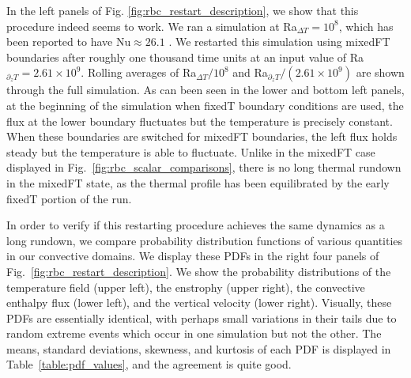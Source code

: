 \documentclass[aps, pre, onecolumn, nofootinbib, notitlepage, groupedaddress, amsfonts, amssymb, amsmath, longbibliography]{revtex4-1}
\begin{document}
In the left panels of Fig. \ref{fig:rbc_restart_description}, we show that this procedure indeed seems to work.
We ran a simulation at Ra$_{\Delta T} = 10^8$, which has been reported to have $\text{Nu} \approx 26.1$ \cite{zhu&all2018}.
We restarted this simulation using mixedFT boundaries after roughly one thousand time units at an input value of Ra$_{\partial_z T} = 2.61 \times 10^9$.
Rolling averages of Ra$_{\Delta T} / 10^8$ and Ra$_{\partial_z T} / (2.61 \times 10^9)$ are shown through the full simulation.
As can been seen in the lower and bottom left panels, at the beginning of the simulation when fixedT boundary conditions are used, the flux at the lower boundary fluctuates but the temperature is precisely constant.
When these boundaries are switched for mixedFT boundaries, the left flux holds steady but the temperature is able to fluctuate.
Unlike in the mixedFT case displayed in Fig.~\ref{fig:rbc_scalar_comparisons}, there is no long thermal rundown in the mixedFT state, as the thermal profile has been equilibrated by the early fixedT portion of the run.

In order to verify if this restarting procedure achieves the same dynamics as a long rundown, we compare probability distribution functions of various quantities in our convective domains.
We display these PDFs in the right four panels of Fig.~\ref{fig:rbc_restart_description}.
We show the probability distributions of the temperature field (upper left), the enstrophy (upper right), the convective enthalpy flux (lower left), and the vertical velocity (lower right).
Visually, these PDFs are essentially identical, with perhaps small variations in their tails due to random extreme events which occur in one simulation but not the other.
The means, standard deviations, skewness, and kurtosis of each PDF is displayed in Table~\ref{table:pdf_values}, and the agreement is quite good.
\end{document}

